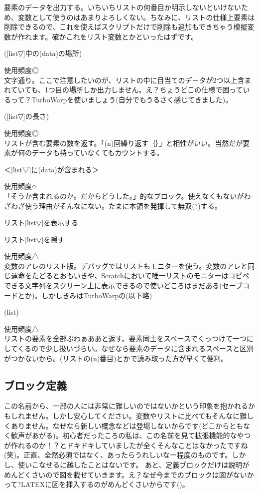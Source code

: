 \documentclass[b5paper,10pt]{jsarticle}
\begin{document}
\begin{multicols*}{3}
要素のデータを出力する。いちいちリストの何番目か明示しないといけないため、変数として使うのはあまりよろしくない。ちなみに、リストの仕様上要素は削除できるので、これを使えばスクリプトだけで削除も追加もできちゃう模擬変数が作れます。確かこれをリスト変数とかといったはずです。
\begin{itembox}{7}
([list▽]中の(data)の場所)
\end{itembox}
使用頻度◎\\
文字通り。ここで注意したいのが、リストの中に目当てのデータが2つ以上含まれていても、1つ目の場所しか出力しません。え？ちょうどこの仕様で困っているって？TurboWarpを使いましょう(自分でもうるさく感じてきました)。
\begin{itembox}{8}
([list▽]の長さ)
\end{itembox}
使用頻度◎\\
リストが含む要素の数を返す。「(n)回繰り返す｛｝」と相性がいい。当然だが要素が何のデータも持っていなくてもカウントする。
\begin{itembox}{9}
＜[list▽]に(data)が含まれる＞
\end{itembox}
使用頻度○\\
「そうか含まれるのか。だからどうした。」的なブロック。使えなくもないがわざわざ使う理由がそんなにない。たまに本領を発揮して無双(?)する。
\begin{itembox}{10}
リスト[list▽]を表示する

リスト[list▽]を隠す
\end{itembox}
使用頻度△\\
変数のアレのリスト版。デバッグではリストもモニターを使う。変数のアレと同じ運命をたどるとおもいきや、Scratchにおいて唯一リストのモニターはコピペできる文字列をスクリーン上に表示できるので使いどころはまだある(セーブコードとか)。しかしきみはTurboWarpの(以下略)
\begin{itembox}{11}
(list)
\end{itembox}
使用頻度△\\
リストの要素を全部ぶわぁああと返す。要素同士をスペースでくっつけて一つにしてくるので少し扱いづらい。なぜなら要素のデータに含まれるスペースと区別がつかないから。(リストの(n)番目)とかで読み取った方が早くて便利。

\subsection{ブロック定義}
この名前から、一部の人には非常に難しいのではないかという印象を抱かれるかもしれません。しかし安心してください。変数やリストに比べてもそんなに難しくありません。なぜなら新しい概念などは登場しないからです(どこからともなく歓声があがる)。初心者だったころの私は、この名前を見て拡張機能的なやつが作れるのか！？とドキドキしていましたが全くそんなことはなかったですね(笑)。正直、全然必須ではなく、あったらうれしいなー程度のものです。しかし、使いこなせるに越したことはないです。
あと、定義ブロックだけは説明がめんどくさいので図を載せていきます。え？なぜ今までのブロックは図がないかって?LATEXに図を挿入するのがめんどくさいからです()。\\


\end{multicols*}
\end{document}

